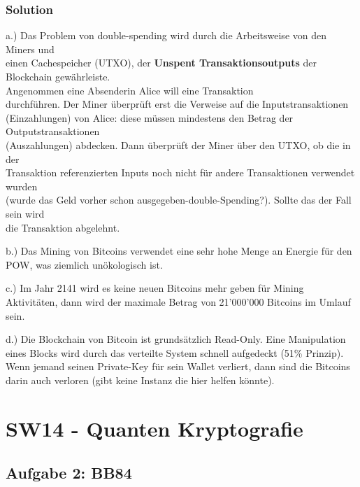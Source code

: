 \documentclass[11pt]{article}
\begin{document}
\hypertarget{solution}{%
\subsubsection{Solution}\label{solution}}

a.) Das Problem von double-spending wird durch die Arbeitsweise von den
Miners und\\
einen Cachespeicher (UTXO), der \textbf{Unspent Transaktionsoutputs} der
Blockchain gewährleiste.\\
Angenommen eine Absenderin Alice will eine Transaktion\\
durchführen. Der Miner überprüft erst die Verweise auf die
Inputstransaktionen\\
(Einzahlungen) von Alice: diese müssen mindestens den Betrag der
Outputstransaktionen\\
(Auszahlungen) abdecken. Dann überprüft der Miner über den UTXO, ob die
in der\\
Transaktion referenzierten Inputs noch nicht für andere Transaktionen
verwendet wurden\\
(wurde das Geld vorher schon ausgegeben-double-Spending?). Sollte das
der Fall sein wird\\
die Transaktion abgelehnt.

b.) Das Mining von Bitcoins verwendet eine sehr hohe Menge an Energie
für den POW, was ziemlich unökologisch ist.

c.) Im Jahr 2141 wird es keine neuen Bitcoins mehr geben für Mining
Aktivitäten, dann wird der maximale Betrag von 21'000'000 Bitcoins im
Umlauf sein.

d.) Die Blockchain von Bitcoin ist grundsätzlich Read-Only. Eine
Manipulation eines Blocks wird durch das verteilte System schnell
aufgedeckt (51\% Prinzip). Wenn jemand seinen Private-Key für sein
Wallet verliert, dann sind die Bitcoins darin auch verloren (gibt keine
Instanz die hier helfen könnte).

\newpage    

    \hypertarget{sw14---quanten-kryptografie}{%
\section{SW14 - Quanten
Kryptografie}\label{sw14---quanten-kryptografie}}

    \hypertarget{aufgabe-2-bb84}{%
\subsection{Aufgabe 2: BB84}\label{aufgabe-2-bb84}}
\end{document}
